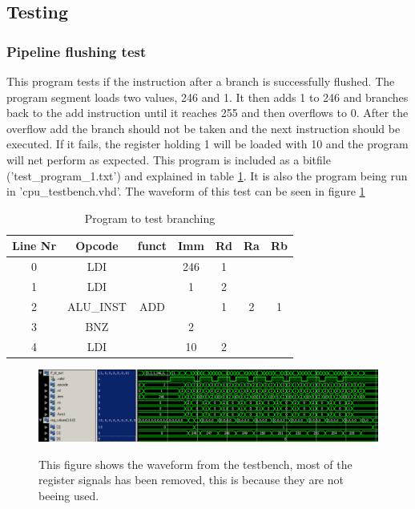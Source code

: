 \documentclass[11pt]{report}
\begin{document}
\subsection*{Testing}

\subsubsection*{Pipeline flushing test}

This program tests if the instruction after a branch is successfully flushed.
The program segment loads two values, 246 and 1. It then adds 1 to 246 and
branches back to the add instruction until it reaches 255 and then overflows
to 0. After the overflow add the branch should not be taken and the next instruction
should be executed. If it fails, the register holding 1 will be loaded with 10
and the program will net perform as expected. This program is included as a bitfile
('test\_program\_1.txt') and explained in table \ref{tab:program1table}. It is also the 
program being run in 'cpu\_testbench.vhd'.
The waveform of this test can be seen in figure \ref{fig:program1wave}

\begin{table}[htbp]
  \centering
  \begin{tabular}{|c|c|c|c|c|c|c|}
    \hline
    Line Nr &	Opcode		&	funct	&	Imm	&	Rd	&	Ra	&	Rb	\\\hline
    	0	&	LDI			&			&	246	&	1	&		&		\\\hline
    	1	&	LDI			&			&	1	&	2	&		&		\\\hline
    	2	&	ALU\_INST	&	ADD		&		&	1	&	2	&	1	\\\hline
    	3	&	BNZ			&			&	2	&		&		&		\\\hline
    	4	&	LDI			&			&	10	&	2	&		&		\\\hline
  \end{tabular}
  \caption{Program to test branching}
  \label{tab:program1table}
\end{table}

\begin{figure}
  \centering
  \includegraphics[width=.95\linewidth]{test1.png} \\
  \caption{This figure shows the waveform from the testbench, 
  most of the register signals has been removed, this is because they are not beeing used.}
  \label{fig:program1wave}
\end{figure}
\end{document}
